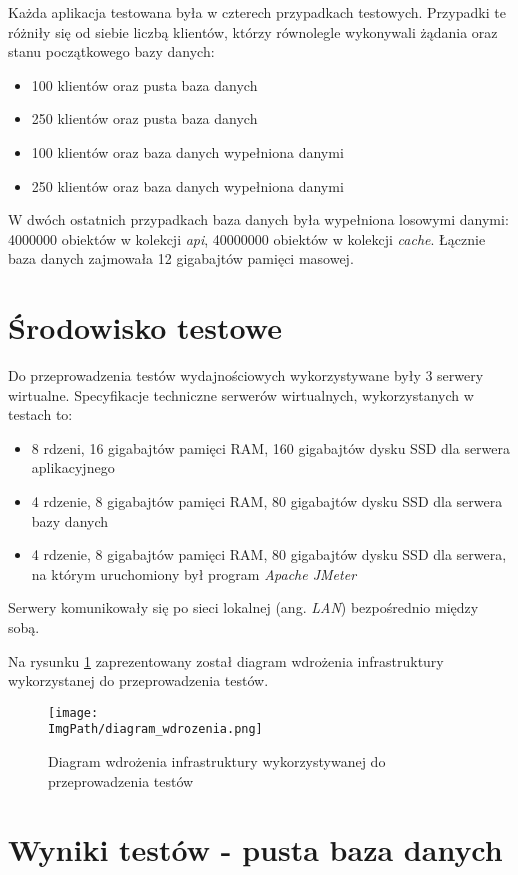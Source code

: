 Każda aplikacja testowana była w czterech przypadkach testowych. Przypadki te różniły się od siebie liczbą klientów, którzy równolegle wykonywali żądania oraz stanu początkowego bazy danych:
\begin{itemize}
    \item 100 klientów oraz pusta baza danych
    \item 250 klientów oraz pusta baza danych
    \item 100 klientów oraz baza danych wypełniona danymi
    \item 250 klientów oraz baza danych wypełniona danymi
\end{itemize}
W dwóch ostatnich przypadkach baza danych była wypełniona losowymi danymi: 4000000 obiektów w kolekcji \textsl{api}, 40000000 obiektów w kolekcji \textsl{cache}. Łącznie baza danych zajmowała 12 gigabajtów pamięci masowej.

\section{Środowisko testowe}
Do przeprowadzenia testów wydajnościowych wykorzystywane były 3 serwery wirtualne. Specyfikacje techniczne serwerów wirtualnych, wykorzystanych w testach to: 
\begin{itemize}
    \item 8 rdzeni, 16 gigabajtów pamięci RAM, 160 gigabajtów dysku SSD dla serwera aplikacyjnego
    \item 4 rdzenie, 8 gigabajtów pamięci RAM, 80 gigabajtów dysku SSD dla serwera bazy danych 
    \item 4 rdzenie, 8 gigabajtów pamięci RAM, 80 gigabajtów dysku SSD dla serwera, na którym uruchomiony był program \textsl{Apache JMeter}
\end{itemize}
Serwery komunikowały się po sieci lokalnej (ang. \textsl{LAN}) bezpośrednio między sobą.

Na rysunku \ref{fig:deployment_diagram} zaprezentowany został diagram wdrożenia infrastruktury wykorzystanej do przeprowadzenia testów.
\begin{figure}[!ht]
\centering
\texttt{[image: \\ImgPath/diagram\_wdrozenia.png]}
\caption{Diagram wdrożenia infrastruktury wykorzystywanej do przeprowadzenia testów}
\label{fig:deployment_diagram}
\end{figure}

\newpage
\section{Wyniki testów - pusta baza danych}

